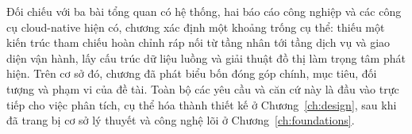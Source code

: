 Đối chiếu với ba bài tổng quan có hệ thống, hai báo cáo công nghiệp và các công cụ
cloud-native hiện có, chương xác định một khoảng trống cụ thể: thiếu một kiến trúc tham
chiếu hoàn chỉnh ráp nối từ tầng nhân tới tầng dịch vụ và giao diện vận hành, lấy cấu trúc
dữ liệu luồng và giải thuật đồ thị làm trọng tâm phát hiện. Trên cơ sở đó, chương đã phát
biểu bốn đóng góp chính, mục tiêu, đối tượng và phạm vi của đề tài. Toàn bộ các yêu cầu và
căn cứ này là đầu vào trực tiếp cho việc phân tích, cụ thể hóa thành thiết kế ở
Chương~\ref{ch:design}, sau khi đã trang bị cơ sở lý thuyết và công nghệ lõi ở
Chương~\ref{ch:foundations}.
